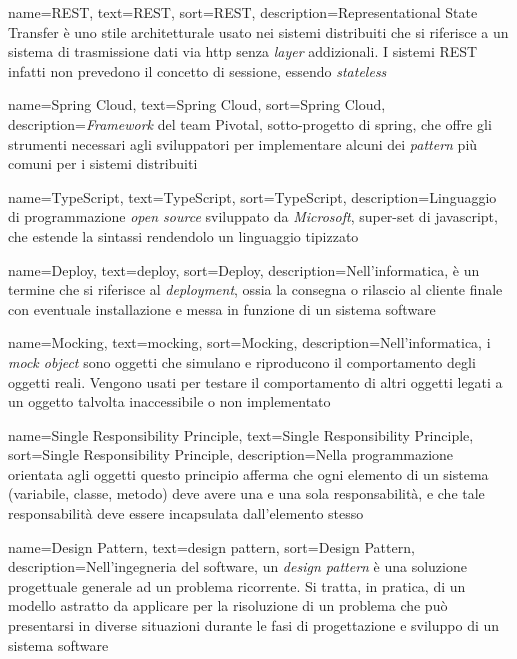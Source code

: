 {
    name=REST,
    text=REST,
    sort=REST,
    description={Representational State Transfer è uno stile architetturale usato nei sistemi distribuiti che si riferisce a un sistema di trasmissione dati via \acrshort{http} senza \emph{layer} addizionali. I sistemi REST infatti non prevedono il concetto di sessione, essendo \textit{stateless}}
}

{
    name=Spring Cloud,
    text=Spring Cloud,
    sort=Spring Cloud,
    description={\textit{Framework} del team Pivotal, sotto-progetto di \gls{spring}, che offre gli strumenti necessari agli sviluppatori per implementare alcuni dei \textit{pattern} più comuni per i sistemi distribuiti}
}

{
    name=TypeScript,
    text=TypeScript,
    sort=TypeScript,
    description={Linguaggio di programmazione \emph{open source} sviluppato da \emph{Microsoft}, super-set di \gls{javascript}, che estende la sintassi rendendolo un linguaggio tipizzato}
}

{
    name=Deploy,
    text=deploy,
    sort=Deploy,
    description={Nell'informatica, è un termine che si riferisce al \emph{deployment}, ossia la consegna o rilascio al cliente finale con eventuale installazione e messa in funzione di un sistema software}
}


{
    name=Mocking,
    text=mocking,
    sort=Mocking,
    description={Nell'informatica, i \emph{mock object} sono oggetti che simulano e riproducono il comportamento degli oggetti reali. Vengono usati per testare il comportamento di altri oggetti legati a un oggetto talvolta inaccessibile o non implementato}
}

{
    name=Single Responsibility Principle,
    text=Single Responsibility Principle,
    sort=Single Responsibility Principle,
    description={Nella programmazione orientata agli oggetti questo principio afferma che ogni elemento di un sistema (variabile, classe, metodo) deve avere una e una sola responsabilità, e che tale responsabilità deve essere incapsulata dall'elemento stesso}
}

{
    name=Design Pattern,
    text=design pattern,
    sort=Design Pattern,
    description={Nell'ingegneria del software, un \emph{design pattern} è una soluzione progettuale generale ad un problema ricorrente. Si tratta, in pratica, di un modello astratto da applicare per la risoluzione di un problema che può presentarsi in diverse situazioni durante le fasi di progettazione e sviluppo di un sistema software}
}

